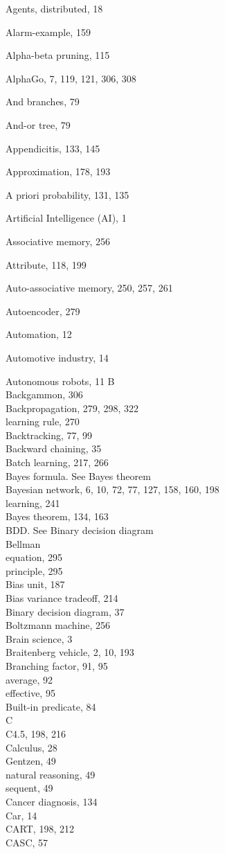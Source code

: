 \documentclass[10pt]{book}
\begin{document}
Agents, distributed, 18

Alarm-example, 159

Alpha-beta pruning, 115

AlphaGo, 7, 119, 121, 306, 308

And branches, 79

And-or tree, 79

Appendicitis, 133, 145

Approximation, 178, 193

A priori probability, 131, 135

Artificial Intelligence (AI), 1

Associative memory, 256

Attribute, 118, 199

Auto-associative memory, 250, 257, 261

Autoencoder, 279

Automation, 12

Automotive industry, 14

Autonomous robots, 11
B\\
Backgammon, 306\\
Backpropagation, 279, 298, 322\\
learning rule, 270\\
Backtracking, 77, 99\\
Backward chaining, 35\\
Batch learning, 217, 266\\
Bayes formula. See Bayes theorem\\
Bayesian network, 6, 10, 72, 77, 127, 158, 160, 198\\
learning, 241\\
Bayes theorem, 134, 163\\
BDD. See Binary decision diagram\\
Bellman\\
equation, 295\\
principle, 295\\
Bias unit, 187\\
Bias variance tradeoff, 214\\
Binary decision diagram, 37\\
Boltzmann machine, 256\\
Brain science, 3\\
Braitenberg vehicle, 2, 10, 193\\
Branching factor, 91, 95\\
average, 92\\
effective, 95\\
Built-in predicate, 84\\
C\\
C4.5, 198, 216\\
Calculus, 28\\
Gentzen, 49\\
natural reasoning, 49\\
sequent, 49\\
Cancer diagnosis, 134\\
Car, 14\\
CART, 198, 212\\
CASC, 57\\
\end{document}
